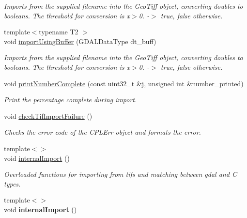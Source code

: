 \begin{DoxyCompactItemize}
\begin{DoxyCompactList}\small\item\em Imports from the supplied filename into the Geo\+Tiff object, converting doubles to booleans. The threshold for conversion is x$>$0. -\/$>$ true, false otherwise. \end{DoxyCompactList}\item 
{\footnotesize template$<$typename T2 $>$ }\\void \hyperlink{class_map_ae88574927ad3a38fc0a9bc253a9e4a7a}{import\+Using\+Buffer} (G\+D\+A\+L\+Data\+Type dt\+\_\+buff)
\begin{DoxyCompactList}\small\item\em Imports from the supplied filename into the Geo\+Tiff object, converting doubles to booleans. The threshold for conversion is x$>$0. -\/$>$ true, false otherwise. \end{DoxyCompactList}\item 
void \hyperlink{class_map_a03e0486e704090765d253b18a9dde0f5}{print\+Number\+Complete} (const uint32\+\_\+t \&j, unsigned int \&number\+\_\+printed)
\begin{DoxyCompactList}\small\item\em Print the percentage complete during import. \end{DoxyCompactList}\item 
void \hyperlink{class_map_a6387185da6dc3063cd2311ffab0a5fba}{check\+Tif\+Import\+Failure} ()\hypertarget{class_map_a6387185da6dc3063cd2311ffab0a5fba}{}\label{class_map_a6387185da6dc3063cd2311ffab0a5fba}

\begin{DoxyCompactList}\small\item\em Checks the error code of the C\+P\+L\+Err object and formats the error. \end{DoxyCompactList}\item 
{\footnotesize template$<$$>$ }\\void \hyperlink{class_map_aad03012fb1c3e434747e62804f3149e9}{internal\+Import} ()
\begin{DoxyCompactList}\small\item\em Overloaded functions for importing from tifs and matching between gdal and C types. \end{DoxyCompactList}\item 
{\footnotesize template$<$$>$ }\\void {\bfseries internal\+Import} ()\hypertarget{class_map_a32564b4934b1523465e5e3d7145af8f3}{}\label{class_map_a32564b4934b1523465e5e3d7145af8f3}


\end{DoxyCompactItemize}
